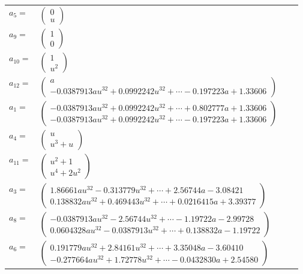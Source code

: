 \documentclass[1p]{elsarticle_modified}
\theoremstyle{definition}
\begin{document}
\begin{tabular}{m{7pt} m{180pt} m{7pt} m{180pt} }
\flushright $a_{5}=$&$\begin{pmatrix}0\\u\end{pmatrix}$ \\
\flushright $a_{9}=$&$\begin{pmatrix}1\\0\end{pmatrix}$ \\
\flushright $a_{10}=$&$\begin{pmatrix}1\\u^2\end{pmatrix}$ \\
\flushright $a_{12}=$&$\begin{pmatrix}a\\-0.0387913 a u^{32}+0.0992242 u^{32}+\cdots-0.197223 a+1.33606\end{pmatrix}$ \\
\flushright $a_{1}=$&$\begin{pmatrix}-0.0387913 a u^{32}+0.0992242 u^{32}+\cdots+0.802777 a+1.33606\\-0.0387913 a u^{32}+0.0992242 u^{32}+\cdots-0.197223 a+1.33606\end{pmatrix}$ \\
\flushright $a_{4}=$&$\begin{pmatrix}u\\u^3+u\end{pmatrix}$ \\
\flushright $a_{11}=$&$\begin{pmatrix}u^2+1\\u^4+2 u^2\end{pmatrix}$ \\
\flushright $a_{3}=$&$\begin{pmatrix}1.86661 a u^{32}-0.313779 u^{32}+\cdots+2.56744 a-3.08421\\0.138832 a u^{32}+0.469443 u^{32}+\cdots+0.0216415 a+3.39377\end{pmatrix}$ \\
\flushright $a_{8}=$&$\begin{pmatrix}-0.0387913 a u^{32}-2.56744 u^{32}+\cdots-1.19722 a-2.99728\\0.0604328 a u^{32}-0.0387913 u^{32}+\cdots+0.138832 a-1.19722\end{pmatrix}$ \\
\flushright $a_{6}=$&$\begin{pmatrix}0.191779 a u^{32}+2.84161 u^{32}+\cdots+3.35048 a-3.60410\\-0.277664 a u^{32}+1.72778 u^{32}+\cdots-0.0432830 a+2.54580\end{pmatrix}$ \\

\end{tabular}
\end{document}
